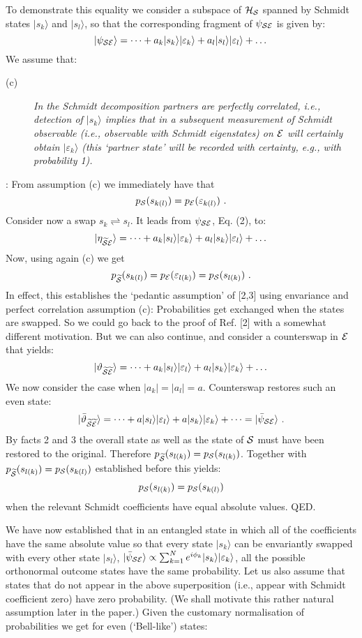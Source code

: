 \documentclass[aps,pra,epsfig,11pt,floatfix]{revtex4}
\begin{document}
To demonstrate this equality we consider a subspace of ${\cal H_S}$ spanned by
Schmidt states $|s_k\rangle$ and $|s_l\rangle$, so that the corresponding
fragment of $\psi_{\cal SE}$ is given by:
$$ |\psi_{\cal SE}\rangle = \dots + a_k|s_k\rangle|\varepsilon_k\rangle
+a_l|s_l\rangle|\varepsilon_l\rangle + \dots $$
We assume that:
\begin{description}
\item [(c)] {\it In the Schmidt decomposition partners are perfectly
correlated, i.e., detection of $|s_k\rangle$ implies that in a subsequent
measurement of Schmidt observable (i.e., observable with Schmidt eigenstates)
on ${\cal E}$ will certainly obtain $|\varepsilon_k\rangle$
(this `partner state' will be recorded with certainty, e.g., with probability 1).}
\end{description}
: From assumption (c) we immediately have that
$$p_{\cal S}(s_{k(l)})= p_{\cal E} (\varepsilon_{k(l)}) \ . $$
Consider now a swap $s_k \rightleftharpoons s_l$. It leads from
$\psi_{\cal SE}$, Eq. (2), to:
$$|\eta_{\widetilde{\cal S}{\cal E}}\rangle=\dots+a_k|s_l\rangle
|\varepsilon_k\rangle +a_l|s_k\rangle|\varepsilon_l\rangle + \dots $$
Now, using again (c) we get
$$p_{\widetilde {\cal S}} (s_{k(l)})
= p_{\cal E} (\varepsilon_{l(k)}) = p_{\cal S}(s_{l(k)})\ . $$
In effect, this establishes the `pedantic assumption' of [2,3] using envariance
and perfect correlation assumption (c): Probabilities get exchanged when
the states are swapped. So we could go back to the proof of Ref. [2] with
a somewhat different motivation. But we can also continue, and consider
a counterswap in ${\cal E}$ that yields:
$$|\vartheta_{\widetilde{\cal S}\widetilde{\cal 
E}}\rangle=\dots+a_k|s_l\rangle|\varepsilon_l\rangle
+a_l|s_k\rangle|\varepsilon_k\rangle + \dots $$
We now consider the case when $|a_k|=|a_l|=a$. Counterswap restores such
an even state:
$$|\bar \vartheta_{\widetilde{\cal S}\widetilde{\cal E}}\rangle
=\dots+a|s_l\rangle|\varepsilon_l\rangle
+a|s_k\rangle|\varepsilon_k\rangle + \dots = |\bar\psi_{\cal SE}\rangle \ . $$
By facts 2 and 3 the overall state as well as the state of ${\cal S}$ must have
been restored to the original. Therefore $ p_{\widetilde{\cal S}}(s_{l(k)}) =
p_{\cal S}(s_{l(k)})$. Together with $p_{\widetilde{\cal S}}(s_{l(k)})=
p_{\cal S}(s_{k(l)})$ established before this yields:
$$ p_{\cal S}(s_{l(k)}) = p_{\cal S}(s_{k(l)})  $$
when the relevant Schmidt coefficients have equal absolute values.
QED.

We have now established that in an entangled state in which all of
the coefficients have the same absolute value so that every state $|s_k\rangle$
can be envariantly swapped with every other state $|s_l\rangle$,
$|\bar\psi_{\cal SE}\rangle \propto \sum_{k=1}^N e^{i \phi_k} |s_k\rangle
|\varepsilon_k\rangle $, all the possible orthonormal outcome states
have the same probability. Let us also assume that states that
do not appear in the above superposition (i.e., appear with Schmidt
coefficient zero) have zero probability. (We shall motivate this rather natural
assumption later in the paper.) Given the customary normalisation
of probabilities we get for even (`Bell-like') states:
\end{document}
